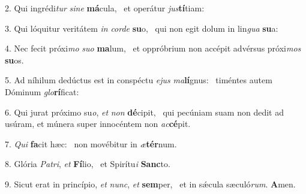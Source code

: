 2. Qui ingrédi\textit{tur} \textit{si}\textit{ne} \textbf{má}cula, \ast\  et operátur \textit{jus}\textbf{tí}tiam:\

3. Qui lóquitur veritátem \textit{in} \textit{cor}\textit{de} \textbf{su}o, \ast\  qui non egit dolum in lin\textit{gua} \textbf{su}a:\

4. Nec fecit próxi\textit{mo} \textit{su}\textit{o} \textbf{ma}lum, \ast\  et oppróbrium non accépit advérsus próxi\textit{mos} \textbf{su}os.\

5. Ad níhilum dedúctus est in conspéctu \textit{e}\textit{jus} \textit{ma}\textbf{lí}gnus: \ast\  timéntes autem Dóminum \textit{glo}\textbf{rí}ficat:\

6. Qui jurat próximo su\textit{o}, \textit{et} \textit{non} \textbf{dé}cipit, \ast\  qui pecúniam suam non dedit ad usúram, et múnera super innocéntem non \textit{ac}\textbf{cé}pit.\

7. \textit{Qui} \textbf{fa}cit hæc: \ast\  non movébitur in \textit{æ}\textbf{tér}num.\

8. Glória \textit{Pa}\textit{tri}, \textit{et} \textbf{Fí}lio, \ast\  et Spirítu\textit{i} \textbf{Sanc}to.\

9. Sicut erat in princípio, \textit{et} \textit{nunc}, \textit{et} \textbf{sem}per, \ast\  et in sǽcula sæculó\textit{rum}. \textbf{A}men.\

